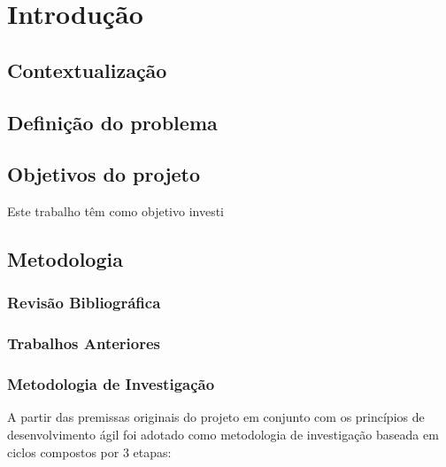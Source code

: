\chapter{Introdução} \label{ch:intro}


\section{Contextualização}


\section{Definição do problema}



\section{Objetivos do projeto}

Este trabalho têm como objetivo investi

\section{Metodologia}

\subsection{Revisão Bibliográfica}

\subsection{Trabalhos Anteriores}

\subsection{Metodologia de Investigação}

A partir das premissas originais do projeto em conjunto com os princípios de desenvolvimento ágil foi adotado como metodologia de investigação baseada em ciclos compostos por 3 etapas:


